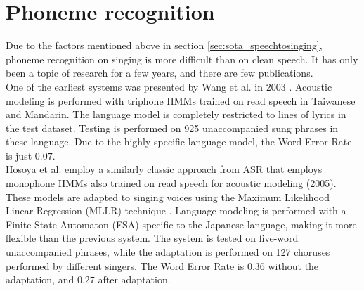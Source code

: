 \section{Phoneme recognition} \label{sec:sota_phonerec}
Due to the factors mentioned above in section \ref{sec:sota_speechtosinging}, phoneme recognition on singing is more difficult than on clean speech. It has only been a topic of research for a few years, and there are few publications.\\

One of the earliest systems was presented by Wang et al. in 2003 \cite{WangLC03}. Acoustic modeling is performed with triphone HMMs trained on read speech in Taiwanese and Mandarin. The language model is completely restricted to lines of lyrics in the test dataset. Testing is performed on 925 unaccompanied sung phrases in these language. Due to the highly specific language model, the Word Error Rate is just $0.07$.\\

Hosoya et al. employ a similarly classic approach from ASR that employs monophone HMMs also trained on read speech for acoustic modeling \cite{Hosoya2005} (2005). These models are adapted to singing voices using the Maximum Likelihood Linear Regression (MLLR) technique \cite{mllr}. Language modeling is performed with a Finite State Automaton (FSA) specific to the Japanese language, making it more flexible than the previous system.
The system is tested on five-word unaccompanied phrases, while the adaptation is performed on 127 choruses performed by different singers. The Word Error Rate is $0.36$ without the adaptation, and $0.27$ after adaptation.\\

